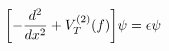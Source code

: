 \begin{equation}
 \biggl [ - {{d^2}\over {dx^2}} + V_T^{(2)} (f) \biggr ] \psi = 
                  \epsilon \psi
\label{schrodinger}
\end{equation}

